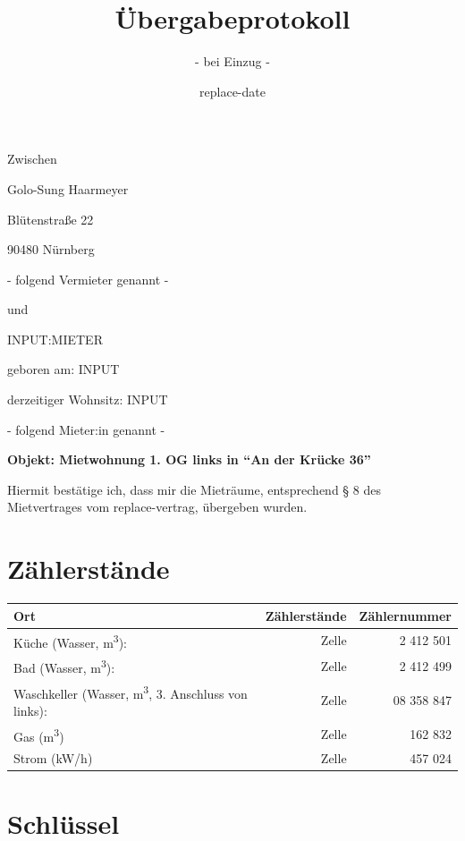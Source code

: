 \documentclass{article}
\title{Übergabeprotokoll}
\subtitle{- bei Einzug -}
\date{replace-date} %
\begin{document}
\maketitle
\thispagestyle{fancy}



Zwischen

Golo-Sung Haarmeyer

Blütenstraße 22

90480 Nürnberg

\hfill - folgend Vermieter genannt -

und

{{INPUT:MIETER}}

geboren am: {{INPUT}}

derzeitiger Wohnsitz: {{INPUT}} 

\hfill - folgend Mieter:in genannt - 

\vspace{1cm}

\textbf{Objekt: Mietwohnung 1. OG links in \enquote{An der Krücke 36}}

Hiermit bestätige ich, dass mir die Mieträume, entsprechend § 8 des Mietvertrages vom replace-vertrag, übergeben wurden.

\section{Zählerstände}%
  \label{sec:Zählerstände}
  
    \begin{tabular}{|l|r|r|}
      \hline
      Ort & Zählerstände & Zählernummer \\
      \hline
      Küche (Wasser, m\textsuperscript{3}): & Zelle & 2 412 501 \\
      \hline
      Bad (Wasser, m\textsuperscript{3}): & Zelle & 2 412 499 \\
      \hline
      Waschkeller (Wasser, m\textsuperscript{3}, 3. Anschluss von links): & Zelle & 08 358 847 \\
      \hline
      Gas (m\textsuperscript{3}) & Zelle & 162 832 \\
      \hline
      Strom (kW/h) & Zelle & 457 024 \\
      \hline
    \end{tabular}

\section{Schlüssel}%
  \label{sec:Schlüssel}
  
\end{document}
